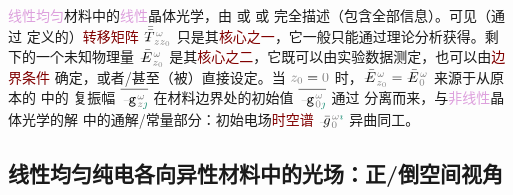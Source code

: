 \textcolor{Plum}{线性}\textcolor{Plum}{均匀}材料中的\textcolor{Plum}{线性}\textcolor{PineGreen}{晶体光学}，由  或  或  完全描述（包含全部信息）。可见（通过  定义的）\textcolor{Maroon}{转移矩阵} $\Xint{\mathcolor{gray}{-}}{30}{\bar{\bar{T}}}^{\;\!\mathcolor{gray}{\omega}}_{\;\! \mathcolor{gray}{z} \mathcolor{gray}{z_0}}$ 只是其\textcolor{Maroon}{核心之一}，它一般只能通过理论分析获得。剩下的一个未知\textcolor{NavyBlue}{物理量} $\Xint{\mathcolor{gray}{-}}{25}{\bar{E}}^{\;\!\mathcolor{gray}{\omega}}_{\;\! \mathcolor{gray}{z_0}}$ 是其\textcolor{Maroon}{核心之二}，它既可以由实验数据测定，也可以由\textcolor{Maroon}{边界条件}  确定，或者/甚至（被）直接设定。当 $\mathcolor{gray}{z_0} = \mathcolor{gray}{0}$ 时，$\Xint{\mathcolor{gray}{-}}{25}{\bar{E}}^{\;\!\mathcolor{gray}{\omega}}_{\;\! \mathcolor{gray}{z_0}} = \Xint{\mathcolor{gray}{-}}{25}{\bar{E}}^{\;\!\mathcolor{gray}{\omega}}_{\;\! \mathcolor{gray}{0}}$ 来源于从原本的  中的 \textcolor{PineGreen}{复振幅} $\overline{\Xint{\begin{smallmatrix} ~ \\ {}^{}_{\mathcolor{gray}{-}} \\ ~ \end{smallmatrix}}{09}{\mathtt{g}}^{\;\!\mathcolor{gray}{\omega}}_{\;\! \mathcolor{gray}{z} \textcolor{PineGreen}{\jmath}}}$ 在材料边界处的初始值 $\overline{\Xint{\begin{smallmatrix} ~ \\ {}^{}_{\mathcolor{gray}{-}} \\ ~ \end{smallmatrix}}{09}{\mathtt{g}}^{\;\!\mathcolor{gray}{\omega}}_{\;\! \mathcolor{gray}{0} \textcolor{PineGreen}{\jmath}}}$ 通过  分离而来，与\textcolor{Plum}{非线性}\textcolor{PineGreen}{晶体光学}的解  中的通解/常量部分：初始电场\textcolor{Maroon}{时空谱} $\Xint{{}^{}_{\mathcolor{gray}{-}}}{10}{\bar{g}}^{\;\!\mathcolor{gray}{\omega} \textcolor{PineGreen}{\imath}}_{\;\! \mathcolor{gray}{0}}$ 异曲同工。

\subsection{线性均匀纯电各向异性材料中的光场：正/倒空间视角}\label{ssec:3times2sandwich-eigen-matrices}

